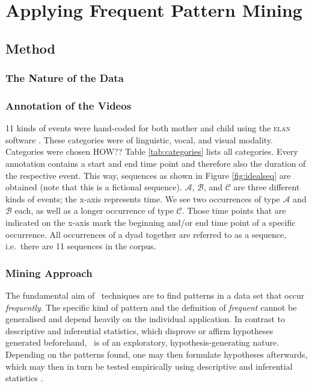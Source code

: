 
\chapter{Applying Frequent Pattern Mining}
\section{Method}
\subsection{The Nature of the Data}

\subsection{Annotation of the Videos}
11 kinds of events were hand-coded for both mother and child using the \textsc{elan} software \cite{wittenburg06}. These categories were of linguistic, vocal, and visual modality. Categories were chosen HOW??  %
Table \ref{tab:categories} lists all categories. Every annotation contains a start and end time point and therefore also the duration of the respective event. This way, sequences as shown in Figure \ref{fig:idealseq} are obtained (note that this is a fictional sequence). \(\mathcal{A}\), \(\mathcal{B}\), and \(\mathcal{C}\) are three different kinds of events; the x-axis represents time. We see two occurrences of type \(\mathcal{A}\) and \(\mathcal{B}\) each, as well as a longer occurrence of type \(\mathcal{C}\). Those time points that are indicated on the x-axis mark the beginning and/or end time point of a specific occurrence. All occurrences of a dyad together are referred to as a sequence, i.e.~there are 11 sequences in the corpus.





\subsection{Mining Approach}
The fundamental aim of \fpm~techniques are to find patterns in a data set that occur \emph{frequently}. The specific kind of pattern and the definition of \emph{frequent} cannot be generalised and depend heavily on the individual application. In contrast to descriptive and inferential statistics, which disprove or affirm hypotheses generated beforehand, \fpm~is of an exploratory, hypothesis-generating nature. Depending on the patterns found, one may then formulate hypotheses afterwards, which may then in turn be tested empirically using descriptive and inferential statistics \cite[PAGEREFS]{rohlfing18,han12}.%

